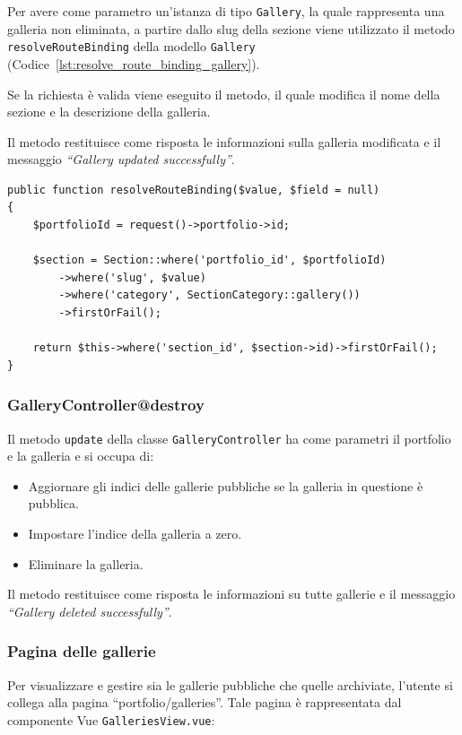 Per avere come parametro un'istanza di tipo \verb|Gallery|, la quale rappresenta una galleria non eliminata, a partire dallo slug della sezione viene utilizzato il metodo \verb|resolveRouteBinding| della modello \verb|Gallery|  (Codice~\ref{lst:resolve_route_binding_gallery}). 

Se la richiesta \`e valida viene eseguito il metodo, il quale modifica il nome della sezione e la descrizione della galleria.

Il metodo restituisce come risposta le informazioni sulla galleria modificata e il messaggio \textit{``Gallery updated successfully''}.

\begin{lstlisting}[caption={Metodo per convertire lo slug in un'istanza \ttfamily{Gallery}}, label={lst:resolve_route_binding_gallery}]
public function resolveRouteBinding($value, $field = null)
{
	$portfolioId = request()->portfolio->id;

	$section = Section::where('portfolio_id', $portfolioId)
		->where('slug', $value)
		->where('category', SectionCategory::gallery())
		->firstOrFail();

	return $this->where('section_id', $section->id)->firstOrFail();
}
\end{lstlisting}



\subsubsection{GalleryController@destroy}
Il metodo \verb|update| della classe \verb|GalleryController| ha come parametri il portfolio e la galleria e si occupa di:
\begin{itemize}
	\item Aggiornare gli indici delle gallerie pubbliche se la galleria in questione \`e pubblica.
	\item Impostare l'indice della galleria a zero.
	\item Eliminare la galleria.
\end{itemize} 

Il metodo restituisce come risposta le informazioni su tutte gallerie e il messaggio \textit{``Gallery deleted successfully''}.

\subsubsection{Pagina delle gallerie}
Per visualizzare e gestire sia le gallerie pubbliche che quelle archiviate, l'utente si collega alla pagina ``portfolio/galleries''. Tale pagina \`e rappresentata dal componente Vue \verb|GalleriesView.vue|:

